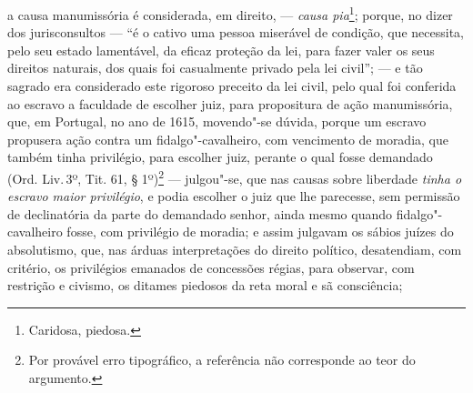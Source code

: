 a causa manumissória é considerada, em direito, --- \emph{causa
pia}\footnote{Caridosa, piedosa.}; porque, no dizer dos jurisconsultos
--- ``é o cativo uma pessoa miserável de condição, que necessita, pelo
seu estado lamentável, da eficaz proteção da lei, para fazer valer os
seus direitos naturais, dos quais foi casualmente privado pela lei
civil''; --- e tão sagrado era considerado este rigoroso preceito da lei
civil, pelo qual foi conferida ao escravo a faculdade de escolher juiz,
para propositura de ação manumissória, que, em Portugal, no ano de 1615,
movendo"-se dúvida, porque um escravo propusera ação contra um
fidalgo"-cavalheiro, com vencimento de moradia, que também tinha
privilégio, para escolher juiz, perante o qual fosse demandado (Ord.
Liv.\,3º, Tit. 61, § 1º)\footnote{Por provável erro tipográfico, a
  referência não corresponde ao teor do argumento.} --- julgou"-se,
que nas causas sobre liberdade \emph{tinha o escravo maior privilégio},
e podia escolher o juiz que lhe parecesse, sem permissão de declinatória
da parte do demandado senhor, ainda mesmo quando fidalgo"-cavalheiro
fosse, com privilégio de moradia; e assim julgavam os sábios juízes do
absolutismo, que, nas árduas interpretações do direito político,
desatendiam, com critério, os privilégios emanados de concessões régias,
para observar, com restrição e civismo, os ditames piedosos da reta
moral e sã consciência;

